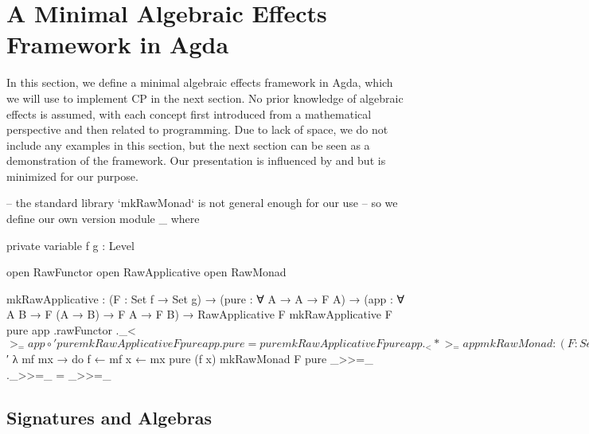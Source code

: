 \section{A Minimal Algebraic Effects Framework in Agda}

In this section, we define a minimal algebraic effects framework in Agda, which we will use to implement CP in the next section.
%
No prior knowledge of algebraic effects is assumed, with each concept first introduced from a mathematical perspective and then related to programming.
%
Due to lack of space, we do not include any examples in this section, but the next section can be seen as a demonstration of the framework.
%
Our presentation is influenced by \citet{bauer-2019} and \citet{kidney-2023} but is minimized for our purpose.


\begin{code}[hide]
-- the standard library `mkRawMonad` is not general enough for our use
-- so we define our own version
module _ where

  private
    variable
      f g : Level

  open RawFunctor
  open RawApplicative
  open RawMonad

  mkRawApplicative :
    (F : Set f → Set g) →
    (pure : ∀ {A} → A → F A) →
    (app : ∀ {A B} → F (A → B) → F A → F B) →
    RawApplicative F
  mkRawApplicative F pure app .rawFunctor ._<$>_ = app ∘′ pure
  mkRawApplicative F pure app .pure = pure
  mkRawApplicative F pure app ._<*>_ = app

  mkRawMonad :
    (F : Set f → Set g) →
    (pure : ∀ {A} → A → F A) →
    (bind : ∀ {A B} → F A → (A → F B) → F B) →
    RawMonad F
  mkRawMonad F pure _>>=_ .rawApplicative =
    mkRawApplicative _ pure $′ λ mf mx → do
      f ← mf
      x ← mx
      pure (f x)
  mkRawMonad F pure _>>=_ ._>>=_ = _>>=_
\end{code}

\subsection{Signatures and Algebras}

